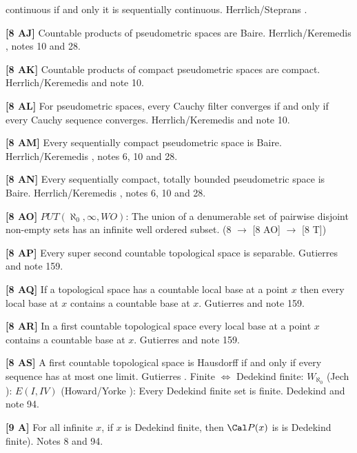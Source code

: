 continuous if and only it is sequentially continuous.
\ac{Herrlich/Steprans} \cite{1997}.
\smallskip
\item{}{\bf [8 AJ]} Countable products of pseudometric spaces are
Baire. \ac{Herrlich/Keremedis} \cite{1999a}, notes 10 and 28.
\smallskip
\item{}{\bf [8 AK]} Countable products of compact pseudometric spaces are
compact. \ac{Herrlich/Keremedis} \cite{1999a} and note 10.
\smallskip
\item{}{\bf [8 AL]} For pseudometric spaces, every Cauchy filter
converges if and only if every Cauchy sequence converges.
\ac{Herrlich/Keremedis} \cite{1999a} and note 10.
\smallskip
\item{}{\bf [8 AM]} Every sequentially compact pseudometric space is
Baire. \ac{Herrlich/Keremedis} \cite{1999}, notes 6, 10 and 28.
\smallskip
\item{}{\bf [8 AN]} Every sequentially compact, totally bounded
pseudometric space is Baire. \ac{Herrlich/Keremedis} \cite{1999}, notes 6, 10 and 28.
\smallskip
\item{}{\bf [8 AO]} $PUT(\aleph_0,\infty,WO)$: The union of a
denumerable set of pairwise disjoint non-empty sets has an infinite well
ordered subset. (8  $\to$ [8 AO] $\to$ [8 T])
\smallskip
\item{}{\bf [8 AP]} Every super second countable topological space is
separable.  \ac{Gutierres} \cite{2004} and note 159. 
\smallskip
\item{}{\bf [8 AQ]} If a topological space has a countable local base at a
point $x$ then every local base at $x$ contains a countable base at $x$.
\ac{Gutierres} \cite{2004} and note 159.
\smallskip
\item{}{\bf [8 AR]} In a first countable topological space every local
base at a point $x$ contains a countable base at $x$.  \ac{Gutierres}
\cite{2004} and note 159.
\smallskip
\item{}{\bf [8 AS]} A first countable topological space is Hausdorff if
and only if every sequence has at most one limit.  \ac{Gutierres}
\cite{2004}.
\medskip
{} Finite $\Leftrightarrow$ Dedekind finite:
$W_{\aleph_{0}}$ (\ac{Jech} \cite{1973b}): $E(I,IV)$ (\ac{Howard/Yorke}
\cite{1989}): Every Dedekind finite set is finite. \ac{Dedekind} \cite{1888}
and note 94.
\smallskip
\item{}{\bf [9 A]} For all infinite $x$, if $x$ is Dedekind finite,
then $\Cal P(x)$ is is Dedekind finite).  Notes 8 and 94.
